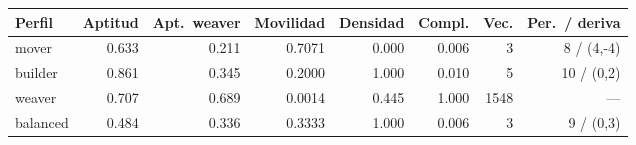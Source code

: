 \begin{tabular}{lrrrrrrr}
\toprule
Perfil & Aptitud & Apt.\ weaver & Movilidad & Densidad & Compl. & Vec. & Per.\ / deriva \\
\midrule
mover & 0.633 & 0.211 & 0.7071 & 0.000 & 0.006 & 3 & 8 / (4,-4) \\
builder & 0.861 & 0.345 & 0.2000 & 1.000 & 0.010 & 5 & 10 / (0,2) \\
weaver & 0.707 & 0.689 & 0.0014 & 0.445 & 1.000 & 1548 & --- \\
balanced & 0.484 & 0.336 & 0.3333 & 1.000 & 0.006 & 3 & 9 / (0,3) \\
\bottomrule
\end{tabular}
